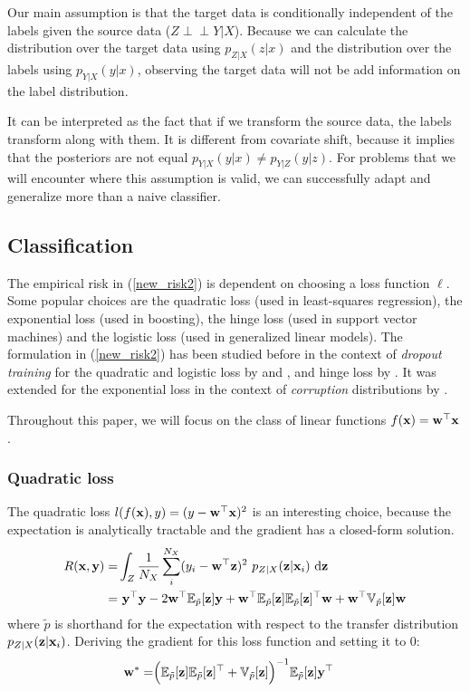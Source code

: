 \documentclass[twoside,11pt]{article}
\def\ci{\perp\!\!\!\perp}
\begin{document}
Our main assumption is that the target data is conditionally independent of the labels given the source data ($Z \ci Y | X$). Because we can calculate the distribution over the target data using $p_{Z|X}(z|x)$ and the distribution over the labels using $p_{Y|X}(y|x)$, observing the target data will not be add information on the label distribution. 

It can be interpreted as the fact that if we transform the source data, the labels transform along with them. It is different from covariate shift, because it implies that the posteriors are not equal $p_{Y|X}(y|x) \neq p_{Y|Z}(y|z)$. For problems that we will encounter where this assumption is valid, we can successfully adapt and generalize more than a naive classifier.

\subsection{Classification}
The empirical risk in (\ref{new_risk2}) is dependent on choosing a loss function $\ell$. Some popular choices are the quadratic loss (used in least-squares regression), the exponential loss (used in boosting), the hinge loss (used in support vector machines) and the logistic loss (used in generalized linear models). The formulation in (\ref{new_risk2}) has been studied before in the context of \emph{dropout training} for the quadratic and logistic loss by \cite{wager2013dropout} and \cite{rostamizadeh2011learning}, and hinge loss by \cite{chen2014dropout}. It was extended for the exponential loss in the context of \emph{corruption} distributions by \cite{van2013learning}.

Throughout this paper, we will focus on the class of linear functions $f({\bf x}) = {\bf w^{\top}x}$.

\subsubsection{Quadratic loss}
The quadratic loss $l(f({\bf x}),y)=(y-{\bf w}^{\top}{\bf x})^{2}$ is an interesting choice, because the expectation is analytically tractable and the gradient has a closed-form solution.
\begin{align}
	R({\bf x},{\bf y}) =& \int_{Z} \frac{1}{N_{X}}\sum_{i}^{N_{X}} (y_{i}-{\bf w}^{\top} {\bf z})^{2} \ p_{Z|X}({\bf z}|{\bf x}_{i}) \ \mathrm{d}{\bf z} \nonumber \\
	=& \  {\bf y^{\top}y} - 2{\bf w}^{\top}\mathbb{E}_{\tilde{p}}[{\bf z]y} + {\bf w}^{\top}\mathbb{E}_{\tilde{p}}[{\bf z}]\mathbb{E}_{\tilde{p}}[{\bf z]^{\top}w}   + {\bf w}^{\top}\mathbb{V}_{\tilde{p}}[{\bf z]w} \label{qd_loss}
\end{align}
where $\tilde{p}$ is shorthand for the expectation with respect to the transfer distribution $p_{Z|X}({\bf z}|{\bf x}_{i})$. Deriving the gradient for this loss function and setting it to $0$:
\begin{align}
{\bf w}^{*} =& \Big( \mathbb{E}_{\tilde{p}}[{\bf z}] \mathbb{E}_{\tilde{p}}[{\bf z}]^{\top} + \mathbb{V}_{\tilde{p}}[{\bf z}] \Big)^{-1} \mathbb{E}_{\tilde{p}}[{\bf z}]{\bf y}^{\top}
\end{align}
\end{document}
